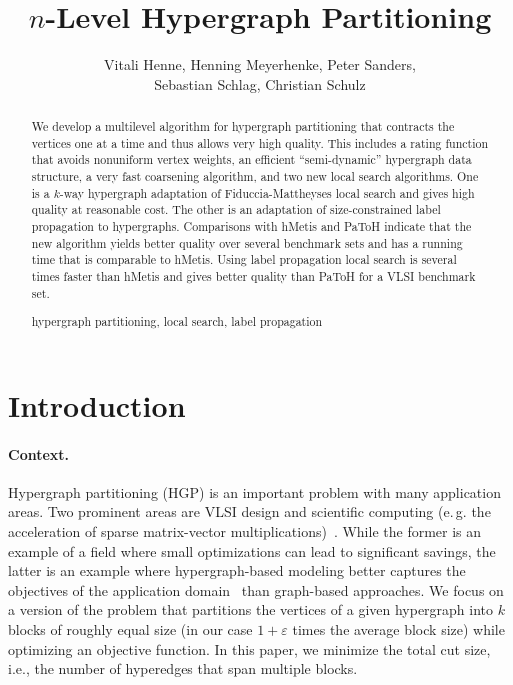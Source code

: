 \documentclass[runningheads,a4paper]{llncs}
\newcommand{\keywords}[1]{\par\addvspace\baselineskip
\noindent\keywordname\enspace\ignorespaces#1}
\newcommand{\eg}{e.\,g.\xspace}
\begin{document}
\npthousandsep{\ }
 \mainmatter  


\title{$n$-Level Hypergraph Partitioning}


\author{Vitali Henne,
  Henning Meyerhenke,
  Peter Sanders,\\ 
  Sebastian Schlag,
  Christian Schulz}




\maketitle


\begin{abstract}
We develop a multilevel algorithm for hypergraph partitioning that contracts the vertices one at a time and thus allows very high quality. This includes a rating function that avoids nonuniform vertex weights, an efficient ``semi-dynamic'' hypergraph data structure, a very fast coarsening algorithm, and two new local search algorithms. One is a $k$-way hypergraph adaptation of Fiduccia-Mattheyses local search and gives high quality at reasonable cost. The other is an adaptation of size-constrained label propagation to hypergraphs. Comparisons with hMetis and PaToH indicate that the new algorithm yields better quality over several benchmark sets and has a running time that is comparable to hMetis. Using label propagation local search is several times faster than hMetis and gives better quality than PaToH for a VLSI benchmark set. 

\keywords{hypergraph partitioning, local search, label propagation}
\end{abstract}


\section{Introduction} \label{Introduction}
\paragraph{Context.}
Hypergraph partitioning (HGP) is an important problem with many application areas. Two prominent areas are 
VLSI design and scientific computing (\eg the acceleration of sparse matrix-vector multiplications)~\cite{Papa2007}.
While the former is an example of a field where small optimizations can lead to significant savings, the latter
is an example where hypergraph-based modeling better captures the objectives of the 
application domain~\cite{PaToH} than graph-based approaches. We focus on a version of the problem that partitions the vertices of a given
hypergraph into $k$ blocks of roughly equal size (in our case $1+\varepsilon$ times the average block size) while optimizing
an objective function. In this paper, we minimize the total cut size, i.e., the number of hyperedges that span multiple blocks.
\end{document}
